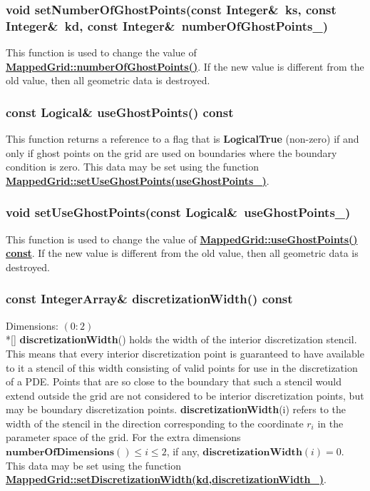 \documentclass{article}
\begin{document}
  \subsubsection{void setNumberOfGhostPoints(const Integer\&~ks, const Integer\&~kd, const Integer\&~numberOfGhostPoints\_)}
  \label{MappedGrid::setNumberOfGhostPoints(ks,kd,numberOfGhostPoints_)}
    This function is used to change the value of
    {\bf{}\hyperref{numberOfGhostPoints()}{numberOfGhostPoints() \rm(\S}{)}{MappedGrid::numberOfGhostPoints()}}.
    If the new value is different from the old value, then all geometric data is destroyed.

  \subsubsection{const Logical\& useGhostPoints() const}
  \label{MappedGrid::useGhostPoints() const}
    This function returns a reference to a flag that is \textbf{LogicalTrue} (non-zero) if and only if
    ghost points on the grid are used on boundaries where the boundary condition is zero.
    This data may be set using the function
    {\bf{}\hyperref{setUseGhostPoints(useGhostPoints\_)}{setUseGhostPoints(useGhostPoints\_) \rm(\S}{)}{MappedGrid::setUseGhostPoints(useGhostPoints_)}}.

  \subsubsection{void setUseGhostPoints(const Logical\&~useGhostPoints\_)}
  \label{MappedGrid::setUseGhostPoints(useGhostPoints_)}
    This function is used to change the value of
    {\bf{}\hyperref{useGhostPoints()}{useGhostPoints() \rm(\S}{)}{MappedGrid::useGhostPoints() const}}.
    If the new value is different from the old value, then all geometric data is destroyed.

  \subsubsection{const IntegerArray\& discretizationWidth() const}
  \label{MappedGrid::discretizationWidth()}
    Dimensions: $(0\colon2)$ \\*[\parskip]
    \textbf{discretizationWidth}() holds the width of the interior discretization stencil.
    This means that every interior discretization point is guaranteed to have available to it
    a stencil of this width consisting of valid points for use in the discretization of a PDE.
    Points that are so close to the boundary that such a stencil would extend outside the grid
    are not considered to be interior discretization points, but may be boundary discretization points.
    \textbf{discretizationWidth}(i) refers to the width of the stencil in the direction
    corresponding to the coordinate $r_i$ in the parameter space of the grid.
    For the extra dimensions $\textbf{numberOfDimensions}()\le i \le 2$, if any, $\textbf{discretizationWidth}(i)=0$.
    This data may be set using the function
    {\bf{}\hyperref{setDiscretizationWidth(kd,discretizationWidth\_)}{setDiscretizationWidth(kd,discretizationWidth\_) \rm(\S}{)}{MappedGrid::setDiscretizationWidth(kd,discretizationWidth_)}}.
\end{document}
